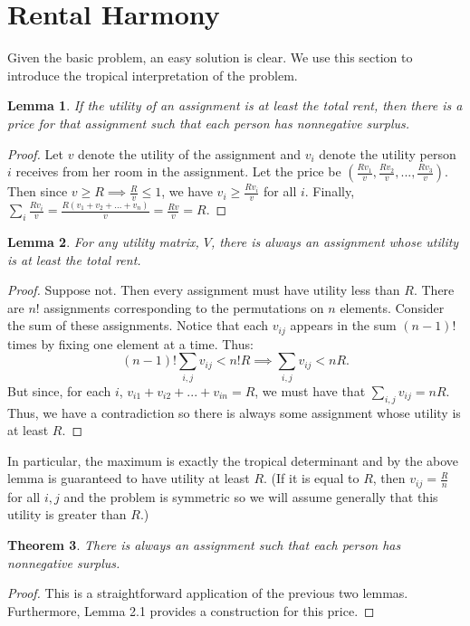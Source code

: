 \documentclass[12pt]{article}
\newtheorem{thm}{Theorem}[section]
\newtheorem{lem}[thm]{Lemma}
\begin{document}
\section{Rental  Harmony}

Given the basic problem, an easy solution is clear. We use this section to introduce the tropical interpretation of the problem. 

\begin{lem}
If the utility of an assignment is at least the total rent, then there is a price for that assignment such that each person has nonnegative surplus.
\end{lem}

\begin{proof}
Let $v$ denote the utility of the assignment and $v_i$ denote the utility person $i$ receives from her room in the assignment. Let the price be $(\frac{Rv_1}{v},\frac{Rv_2}{v},...,\frac{Rv_3}{v})$. Then since $v\ge R\implies \frac{R}{v}\le1$, we have $v_i\ge \frac{Rv_i}{v}$ for all $i$. Finally, $\sum_i \frac{Rv_i}{v}=\frac{R(v_1+v_2+...+v_n)}{v}=\frac{Rv}{v}=R$.
\end{proof}

\begin{lem}
For any utility matrix, $V$, there is always an assignment whose utility is at least the total rent. 
\end{lem}

\begin{proof}
Suppose not. Then every assignment must have utility less than $R$. There are $n!$ assignments corresponding to the permutations on $n$ elements. Consider the sum of these assignments. Notice that each $v_{ij}$ appears in the sum $(n-1)!$ times by fixing one element at a time. Thus: \[(n-1)!\sum_{i,j} v_{ij}< n!R\implies\sum_{i,j}v_{ij}<nR.\]
But since, for each $i$, $v_{i1}+v_{i2}+...+v_{in}=R$, we must have that $\sum_{i,j}v_{ij}=nR$. Thus, we have a contradiction so there is always some assignment whose utility is at least $R$.
\end{proof}
\noindent
In particular, the maximum is exactly the tropical determinant and by the above lemma is guaranteed to have utility at least $R$. (If it is equal to $R$, then $v_{ij}=\frac{R}{n}$ for all $i,j$ and the problem is symmetric so we will assume generally that this utility is greater than $R$.)

\begin{thm}
There is always an assignment such that each person has nonnegative surplus.
\end{thm}

\begin{proof}
This is a straightforward application of the previous two lemmas. Furthermore, Lemma 2.1 provides a construction for this price.
\end{proof}


\noindent




\end{document}
